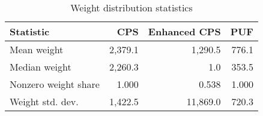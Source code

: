 \begin{table}[h]
    \centering
    \caption{Weight distribution statistics}
    \label{tab:weight_stats}
    \begin{tabular}{lrrr}
    \toprule
    Statistic & CPS & Enhanced CPS & PUF \\
    \midrule
    Mean weight & 2,379.1 & 1,290.5 & 776.1 \\
    Median weight & 2,260.3 & 1.0 & 353.5 \\
    Nonzero weight share & 1.000 & 0.538 & 1.000 \\
    Weight std. dev. & 1,422.5 & 11,869.0 & 720.3 \\
    \bottomrule
    \end{tabular}
\end{table}
